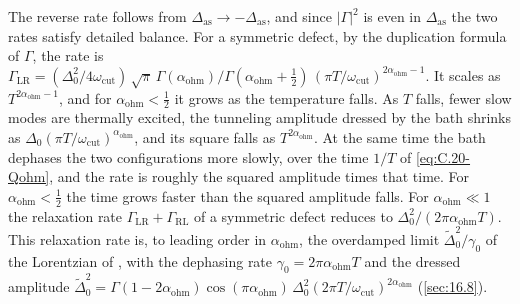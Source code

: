 The reverse rate follows from $\Delta_{\mathrm{as}} \to -\Delta_{\mathrm{as}}$, and since $|\Gamma|^2$ is even in $\Delta_{\mathrm{as}}$ the two rates satisfy detailed balance. For a symmetric defect, by the duplication formula of $\Gamma$, the rate is $\varGamma_{\mathrm{LR}} = (\Delta_0^2/4\omega_{\mathrm{cut}})\,\sqrt\pi\,\Gamma(\alpha_{\mathrm{ohm}})/\Gamma(\alpha_{\mathrm{ohm}} + \tfrac12)\,(\pi T/\omega_{\mathrm{cut}})^{2\alpha_{\mathrm{ohm}} - 1}$. It scales as $T^{2\alpha_{\mathrm{ohm}} - 1}$, and for $\alpha_{\mathrm{ohm}} < \tfrac12$ it grows as the temperature falls. As $T$ falls, fewer slow modes are thermally excited, the tunneling amplitude dressed by the bath shrinks as $\Delta_0(\pi T/\omega_{\mathrm{cut}})^{\alpha_{\mathrm{ohm}}}$, and its square falls as $T^{2\alpha_{\mathrm{ohm}}}$. At the same time the bath dephases the two configurations more slowly, over the time $1/T$ of \cref{eq:C.20-Qohm}, and the rate is roughly the squared amplitude times that time. For $\alpha_{\mathrm{ohm}} < \tfrac12$ the time grows faster than the squared amplitude falls. For $\alpha_{\mathrm{ohm}} \ll 1$ the relaxation rate $\varGamma_{\mathrm{LR}} + \varGamma_{\mathrm{RL}}$ of a symmetric defect reduces to $\Delta_0^2/(2\pi\alpha_{\mathrm{ohm}}T)$. This relaxation rate is, to leading order in $\alpha_{\mathrm{ohm}}$, the overdamped limit $\tilde\Delta_0^2/\gamma_0$ of the Lorentzian of \cite[Eq.~(10)]{qureshi1995dynamics}, with the dephasing rate $\gamma_0 = 2\pi\alpha_{\mathrm{ohm}}T$ and the dressed amplitude $\tilde\Delta_0^2 = \Gamma(1 - 2\alpha_{\mathrm{ohm}})\cos(\pi\alpha_{\mathrm{ohm}})\,\Delta_0^2(2\pi T/\omega_{\mathrm{cut}})^{2\alpha_{\mathrm{ohm}}}$ (\cref{sec:16.8}).


